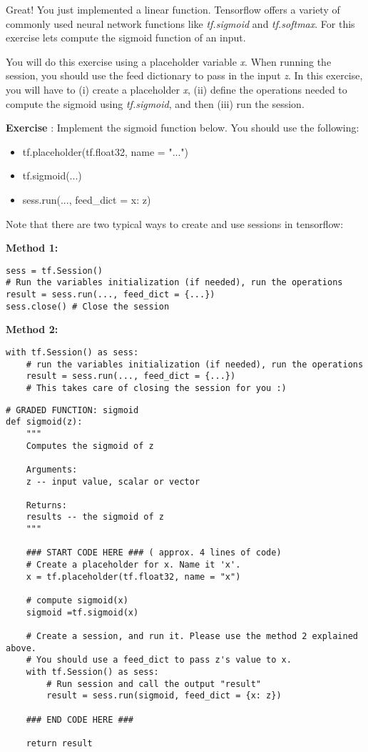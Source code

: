 
Great! You just implemented a linear function. Tensorflow offers a variety of commonly used neural network functions like \emph{tf.sigmoid} and \emph{tf.softmax}. For this exercise lets compute the sigmoid function of an input. 

You will do this exercise using a placeholder variable \emph{x}. When running the session, you should use the feed dictionary to pass in the input \emph{z}. In this exercise, you will have to (i) create a placeholder \emph{x}, (ii) define the operations needed to compute the sigmoid using \emph{tf.sigmoid}, and then (iii) run the session. 

{\textbf { Exercise }}: Implement the sigmoid function below. You should use the following: 
\begin{itemize}
\item tf.placeholder(tf.float32, name = "...")
\item tf.sigmoid(...)
\item sess.run(..., feed\_dict = {x: z})
\end{itemize}

Note that there are two typical ways to create and use sessions in tensorflow: 

{\textbf { Method 1:}}
\begin{verbatim} 
sess = tf.Session()
# Run the variables initialization (if needed), run the operations
result = sess.run(..., feed_dict = {...})
sess.close() # Close the session
\end{verbatim}  

{\textbf { Method 2:}}
\begin{verbatim} 
with tf.Session() as sess: 
    # run the variables initialization (if needed), run the operations
    result = sess.run(..., feed_dict = {...})
    # This takes care of closing the session for you :)
\end{verbatim}  

\begin{verbatim} 
# GRADED FUNCTION: sigmoid
def sigmoid(z):
    """
    Computes the sigmoid of z
    
    Arguments:
    z -- input value, scalar or vector
    
    Returns: 
    results -- the sigmoid of z
    """
    
    ### START CODE HERE ### ( approx. 4 lines of code)
    # Create a placeholder for x. Name it 'x'.
    x = tf.placeholder(tf.float32, name = "x")

    # compute sigmoid(x)
    sigmoid =tf.sigmoid(x)

    # Create a session, and run it. Please use the method 2 explained above. 
    # You should use a feed_dict to pass z's value to x. 
    with tf.Session() as sess:
        # Run session and call the output "result"
        result = sess.run(sigmoid, feed_dict = {x: z})
    
    ### END CODE HERE ###
    
    return result
\end{verbatim}  


